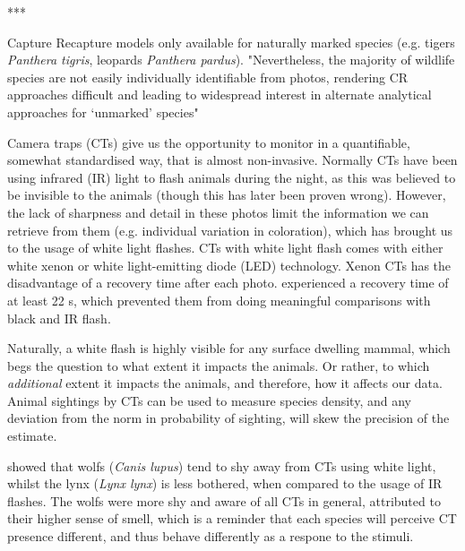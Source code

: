 ***



Capture Recapture models only available for naturally marked species (e.g. tigers \textit{Panthera tigris}, leopards \textit{Panthera pardus}). 
"Nevertheless, the majority of wildlife species are not easily individually identifiable from photos, rendering CR approaches difficult and leading to widespread interest in alternate analytical approaches for ‘unmarked’ species" \cite{Burton2015} %


Camera traps (CTs) give us the opportunity to monitor in a quantifiable, somewhat standardised way, that is almost non-invasive. 
Normally CTs have been using infrared (IR) light to flash animals during the night, as this was believed to be invisible to the animals (though this has later been proven wrong). %
However, the lack of sharpness and detail in these photos limit the information we can retrieve from them (e.g. individual variation in coloration), which has brought us to the usage of white light flashes.
CTs with white light flash comes with either white xenon or white light-emitting diode (LED) technology.
Xenon CTs has the disadvantage of a recovery time after each photo. \cite{Henrich2020} experienced a recovery time of at least 22 s, which prevented them from doing meaningful comparisons with black and IR flash. 

Naturally, a white flash is highly visible for any surface dwelling mammal, which begs the question to what extent it impacts the animals. Or rather, to which \textit{additional} extent it impacts the animals, and therefore, how it affects our data.
Animal sightings by CTs can be used to measure species density, and any deviation from the norm in probability of sighting, will skew the precision of the estimate.


\cite{Beddari2019} showed that wolfs (\textit{Canis lupus}) tend to shy away from CTs using white light, whilst the lynx (\textit{Lynx lynx}) is less bothered, when compared to the usage of IR flashes. %
The wolfs were more shy and aware of all CTs in general, attributed to their higher sense of smell, which is a reminder that each species will perceive CT presence different, and thus behave differently as a respone to the stimuli.

